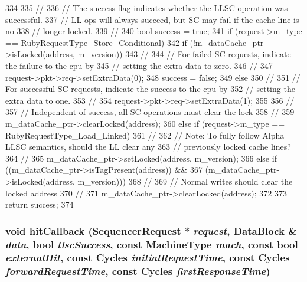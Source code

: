 \begin{DoxyCode}
334 {
335     //
336     // The success flag indicates whether the LLSC operation was successful.
337     // LL ops will always succeed, but SC may fail if the cache line is no
338     // longer locked.
339     //
340     bool success = true;
341     if (request->m_type == RubyRequestType_Store_Conditional) {
342         if (!m_dataCache_ptr->isLocked(address, m_version)) {
343             //
344             // For failed SC requests, indicate the failure to the cpu by
345             // setting the extra data to zero.
346             //
347             request->pkt->req->setExtraData(0);
348             success = false;
349         } else {
350             //
351             // For successful SC requests, indicate the success to the cpu by
352             // setting the extra data to one.  
353             //
354             request->pkt->req->setExtraData(1);
355         }
356         //
357         // Independent of success, all SC operations must clear the lock
358         //
359         m_dataCache_ptr->clearLocked(address);
360     } else if (request->m_type == RubyRequestType_Load_Linked) {
361         //
362         // Note: To fully follow Alpha LLSC semantics, should the LL clear any
363         // previously locked cache lines?
364         //
365         m_dataCache_ptr->setLocked(address, m_version);
366     } else if ((m_dataCache_ptr->isTagPresent(address)) &&
367                (m_dataCache_ptr->isLocked(address, m_version))) {
368         //
369         // Normal writes should clear the locked address
370         //
371         m_dataCache_ptr->clearLocked(address);
372     }
373     return success;
374 }
\end{DoxyCode}
\hypertarget{classSequencer_ae5b978643179033488a1153899c085e5}{
\subsubsection[{hitCallback}]{\setlength{\rightskip}{0pt plus 5cm}void hitCallback ({\bf SequencerRequest} $\ast$ {\em request}, \/  {\bf DataBlock} \& {\em data}, \/  bool {\em llscSuccess}, \/  const MachineType {\em mach}, \/  const bool {\em externalHit}, \/  const {\bf Cycles} {\em initialRequestTime}, \/  const {\bf Cycles} {\em forwardRequestTime}, \/  const {\bf Cycles} {\em firstResponseTime})}}
\label{classSequencer_ae5b978643179033488a1153899c085e5}




